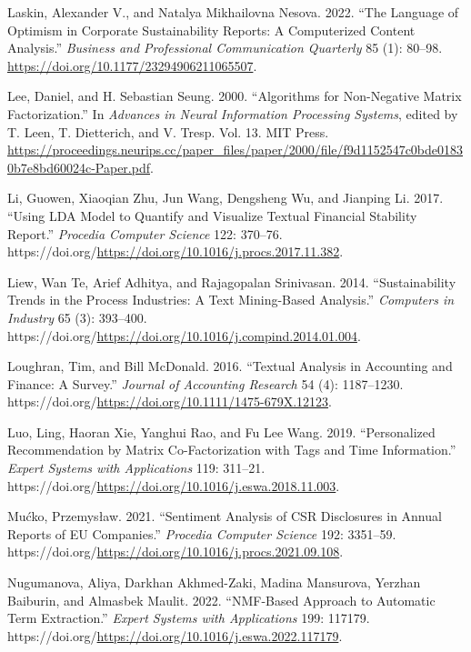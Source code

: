 \documentclass[
]{article}
\newlength{\cslhangindent}
\newlength{\cslentryspacingunit} %
\newenvironment{CSLReferences}[2] %
 {%
  \setlength{\parindent}{0pt}
  \ifodd #1
  \let\oldpar\par
  \def\par{\hangindent=\cslhangindent\oldpar}
  \fi
  \setlength{\parskip}{#2\cslentryspacingunit}
 }%
 {}
\begin{document}
\begin{CSLReferences}{1}{0}
\leavevmode{}%
Laskin, Alexander V., and Natalya Mikhailovna Nesova. 2022. {``The Language of Optimism in Corporate Sustainability Reports: A Computerized Content Analysis.''} \emph{Business and Professional Communication Quarterly} 85 (1): 80--98. \url{https://doi.org/10.1177/23294906211065507}.

\leavevmode{}%
Lee, Daniel, and H. Sebastian Seung. 2000. {``Algorithms for Non-Negative Matrix Factorization.''} In \emph{Advances in Neural Information Processing Systems}, edited by T. Leen, T. Dietterich, and V. Tresp. Vol. 13. MIT Press. \url{https://proceedings.neurips.cc/paper_files/paper/2000/file/f9d1152547c0bde01830b7e8bd60024c-Paper.pdf}.

\leavevmode{}%
Li, Guowen, Xiaoqian Zhu, Jun Wang, Dengsheng Wu, and Jianping Li. 2017. {``Using LDA Model to Quantify and Visualize Textual Financial Stability Report.''} \emph{Procedia Computer Science} 122: 370--76. https://doi.org/\url{https://doi.org/10.1016/j.procs.2017.11.382}.

\leavevmode{}%
Liew, Wan Te, Arief Adhitya, and Rajagopalan Srinivasan. 2014. {``Sustainability Trends in the Process Industries: A Text Mining-Based Analysis.''} \emph{Computers in Industry} 65 (3): 393--400. https://doi.org/\url{https://doi.org/10.1016/j.compind.2014.01.004}.

\leavevmode{}%
Loughran, Tim, and Bill McDonald. 2016. {``Textual Analysis in Accounting and Finance: A Survey.''} \emph{Journal of Accounting Research} 54 (4): 1187--1230. https://doi.org/\url{https://doi.org/10.1111/1475-679X.12123}.

\leavevmode{}%
Luo, Ling, Haoran Xie, Yanghui Rao, and Fu Lee Wang. 2019. {``Personalized Recommendation by Matrix Co-Factorization with Tags and Time Information.''} \emph{Expert Systems with Applications} 119: 311--21. https://doi.org/\url{https://doi.org/10.1016/j.eswa.2018.11.003}.

\leavevmode{}%
Mućko, Przemysław. 2021. {``Sentiment Analysis of CSR Disclosures in Annual Reports of EU Companies.''} \emph{Procedia Computer Science} 192: 3351--59. https://doi.org/\url{https://doi.org/10.1016/j.procs.2021.09.108}.

\leavevmode{}%
Nugumanova, Aliya, Darkhan Akhmed-Zaki, Madina Mansurova, Yerzhan Baiburin, and Almasbek Maulit. 2022. {``NMF-Based Approach to Automatic Term Extraction.''} \emph{Expert Systems with Applications} 199: 117179. https://doi.org/\url{https://doi.org/10.1016/j.eswa.2022.117179}.


\end{CSLReferences}
\end{document}
